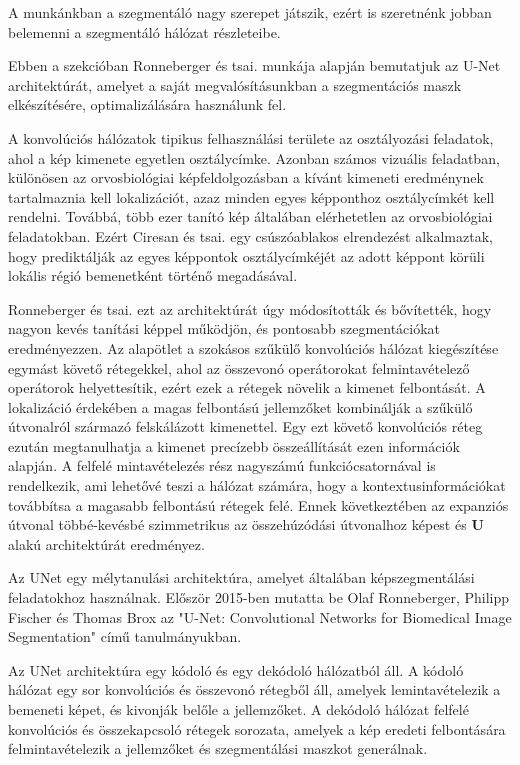 \documentclass[12pt,a4]{article}
\begin{document}
                A munkánkban a szegmentáló nagy szerepet játszik, ezért is szeretnénk jobban belemenni a szegmentáló hálózat részleteibe.
    
                Ebben a szekcióban \cite{unet}Ronneberger és tsai. munkája alapján bemutatjuk az U-Net architektúrát, amelyet a saját megvalósításunkban a szegmentációs maszk elkészítésére, optimalizálására használunk fel. 
    
                A konvolúciós hálózatok tipikus felhasználási területe az osztályozási feladatok, ahol a kép kimenete egyetlen osztálycímke. Azonban számos vizuális feladatban, különösen az orvosbiológiai képfeldolgozásban a kívánt kimeneti eredménynek tartalmaznia kell lokalizációt, azaz minden egyes képponthoz osztálycímkét kell rendelni. Továbbá, több ezer tanító kép általában elérhetetlen az orvosbiológiai feladatokban. Ezért \cite{ciresan}Ciresan és tsai. egy csúszóablakos elrendezést alkalmaztak, hogy prediktálják
                az egyes képpontok osztálycímkéjét az adott képpont körüli lokális régió bemenetként történő megadásával.
    
                \cite{unet}Ronneberger és tsai. ezt az architektúrát úgy módosították és bővítették, hogy
                nagyon kevés tanítási képpel működjön, és pontosabb szegmentációkat eredményezzen.
                Az alapötlet a szokásos szűkülő konvolúciós hálózat kiegészítése egymást követő rétegekkel, ahol az összevonó operátorokat felmintavételező operátorok helyettesítik, ezért ezek a rétegek növelik a kimenet felbontását. A lokalizáció érdekében a magas felbontású jellemzőket kombinálják a szűkülő útvonalról származó felskálázott kimenettel. Egy ezt követő konvolúciós réteg ezután megtanulhatja a kimenet precízebb összeállítását ezen információk alapján. A felfelé mintavételezés rész nagyszámú funkciócsatornával is rendelkezik, ami lehetővé teszi a hálózat számára, hogy a kontextusinformációkat továbbítsa a magasabb felbontású rétegek felé. Ennek következtében az expanziós útvonal többé-kevésbé szimmetrikus az összehúzódási útvonalhoz képest és \textbf{U} alakú architektúrát eredményez.
    
                Az UNet egy mélytanulási architektúra, amelyet általában képszegmentálási feladatokhoz használnak. Először 2015-ben mutatta be \cite{unet}Olaf Ronneberger, Philipp Fischer és Thomas Brox az "U-Net: Convolutional Networks for Biomedical Image Segmentation" című tanulmányukban.
    
                Az UNet architektúra egy kódoló és egy dekódoló hálózatból áll. A kódoló hálózat egy sor konvolúciós és összevonó rétegből áll, amelyek lemintavételezik a bemeneti képet, és kivonják belőle a jellemzőket. A dekódoló hálózat felfelé konvolúciós és összekapcsoló rétegek sorozata, amelyek a kép eredeti felbontására felmintavételezik a jellemzőket és szegmentálási maszkot generálnak.
    
\end{document}
